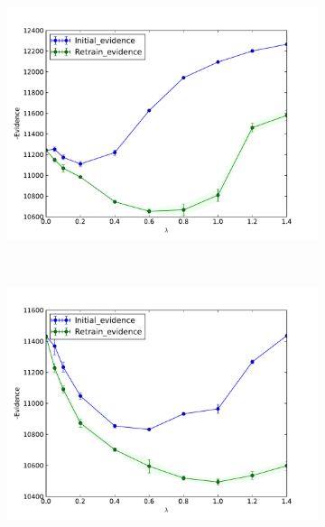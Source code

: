 \begin{figure}[!htp]
	\vspace{-1mm}
	\centering
	\begin{subfigure}[!tp]{0.45\textwidth}
		\includegraphics[width=\textwidth]{plots/smerdov/pruning_evidence_I_I.pdf}
		\caption{}
		\label{evidence_I_I}
	\end{subfigure}
	\vspace{-1mm}
	~
	\hspace{-2mm}
	\begin{subfigure}[!htbp]{0.45\textwidth}
		\includegraphics[width=\textwidth]{plots/smerdov/pruning_evidence_D_I.pdf}

\end{subfigure}
\end{figure}
